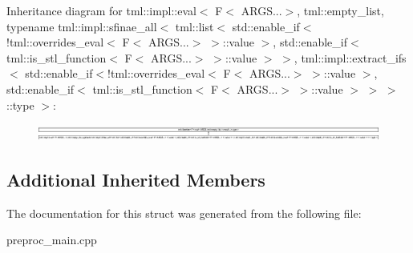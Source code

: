 Inheritance diagram for tml\+:\+:impl\+:\+:eval$<$ F$<$ A\+R\+G\+S...$>$, tml\+:\+:empty\+\_\+list, typename tml\+:\+:impl\+:\+:sfinae\+\_\+all$<$ tml\+:\+:list$<$ std\+:\+:enable\+\_\+if$<$!tml\+:\+:overrides\+\_\+eval$<$ F$<$ A\+R\+G\+S...$>$ $>$\+:\+:value $>$, std\+:\+:enable\+\_\+if$<$ tml\+:\+:is\+\_\+stl\+\_\+function$<$ F$<$ A\+R\+G\+S...$>$ $>$\+:\+:value $>$ $>$, tml\+:\+:impl\+:\+:extract\+\_\+ifs$<$ std\+:\+:enable\+\_\+if$<$!tml\+:\+:overrides\+\_\+eval$<$ F$<$ A\+R\+G\+S...$>$ $>$\+:\+:value $>$, std\+:\+:enable\+\_\+if$<$ tml\+:\+:is\+\_\+stl\+\_\+function$<$ F$<$ A\+R\+G\+S...$>$ $>$\+:\+:value $>$ $>$ $>$\+:\+:type $>$\+:\begin{figure}[H]
\begin{center}
\leavevmode
\includegraphics[height=0.544747cm]{structtml_1_1impl_1_1eval_3_01F_3_01ARGS_8_8_8_4_00_01tml_1_1empty__list_00_01typename_01tml_1_1e176b0f2d7aa560ac6f95be74c4a4a1e}
\end{center}
\end{figure}
\subsection*{Additional Inherited Members}


The documentation for this struct was generated from the following file\+:\begin{DoxyCompactItemize}
\item 
preproc\+\_\+main.\+cpp\end{DoxyCompactItemize}
